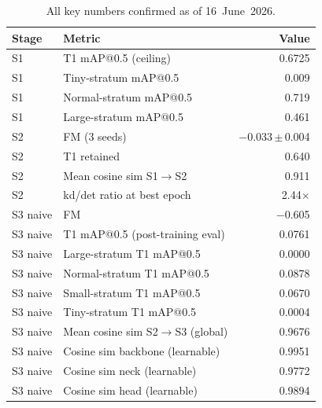 \begin{table}[h]
\centering
\caption{All key numbers confirmed as of 16~June~2026.}
\small
\begin{tabular}{llr}
\hline
\textbf{Stage} & \textbf{Metric} & \textbf{Value} \\
\hline
S1 & T1 mAP@0.5 (ceiling) & 0.6725 \\
S1 & Tiny-stratum mAP@0.5 & 0.009 \\
S1 & Normal-stratum mAP@0.5 & 0.719 \\
S1 & Large-stratum mAP@0.5 & 0.461 \\
\hline
S2 & FM (3 seeds) & $-$0.033\,$\pm$\,0.004 \\
S2 & T1 retained & 0.640 \\
S2 & Mean cosine sim S1$\to$S2 & 0.911 \\
S2 & kd/det ratio at best epoch & 2.44$\times$ \\
\hline
S3 naive & FM & $-$0.605 \\
S3 naive & T1 mAP@0.5 (post-training eval) & 0.0761 \\
S3 naive & Large-stratum T1 mAP@0.5 & 0.0000 \\
S3 naive & Normal-stratum T1 mAP@0.5 & 0.0878 \\
S3 naive & Small-stratum T1 mAP@0.5 & 0.0670 \\
S3 naive & Tiny-stratum T1 mAP@0.5 & 0.0004 \\
S3 naive & Mean cosine sim S2$\to$S3 (global) & 0.9676 \\
S3 naive & Cosine sim backbone (learnable) & 0.9951 \\
S3 naive & Cosine sim neck (learnable) & 0.9772 \\
S3 naive & Cosine sim head (learnable) & 0.9894 \\
\hline
\end{tabular}
\end{table}

